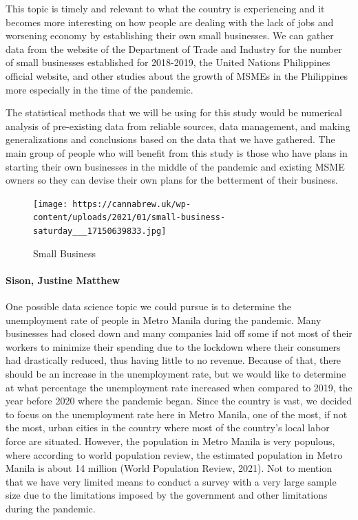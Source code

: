 \documentclass[
]{article}
\begin{document}
This topic is timely and relevant to what the country is experiencing
and it becomes more interesting on how people are dealing with the lack
of jobs and worsening economy by establishing their own small
businesses. We can gather data from the website of the Department of
Trade and Industry for the number of small businesses established for
2018-2019, the United Nations Philippines official website, and other
studies about the growth of MSMEs in the Philippines more especially in
the time of the pandemic.

The statistical methods that we will be using for this study would be
numerical analysis of pre-existing data from reliable sources, data
management, and making generalizations and conclusions based on the data
that we have gathered. The main group of people who will benefit from
this study is those who have plans in starting their own businesses in
the middle of the pandemic and existing MSME owners so they can devise
their own plans for the betterment of their business.

\begin{figure}
\centering
\texttt{[image: https://cannabrew.uk/wp-content/uploads/2021/01/small-business-saturday\_\_\_17150639833.jpg]}
\caption{Small Business}
\end{figure}

\hypertarget{sison-justine-matthew}{%
\paragraph{Sison, Justine Matthew}\label{sison-justine-matthew}}

One possible data science topic we could pursue is to determine the
unemployment rate of people in Metro Manila during the pandemic. Many
businesses had closed down and many companies laid off some if not most
of their workers to minimize their spending due to the lockdown where
their consumers had drastically reduced, thus having little to no
revenue. Because of that, there should be an increase in the
unemployment rate, but we would like to determine at what percentage the
unemployment rate increased when compared to 2019, the year before 2020
where the pandemic began. Since the country is vast, we decided to focus
on the unemployment rate here in Metro Manila, one of the most, if not
the most, urban cities in the country where most of the country's local
labor force are situated. However, the population in Metro Manila is
very populous, where according to world population review, the estimated
population in Metro Manila is about 14 million (World Population Review,
2021). Not to mention that we have very limited means to conduct a
survey with a very large sample size due to the limitations imposed by
the government and other limitations during the pandemic.
\end{document}
